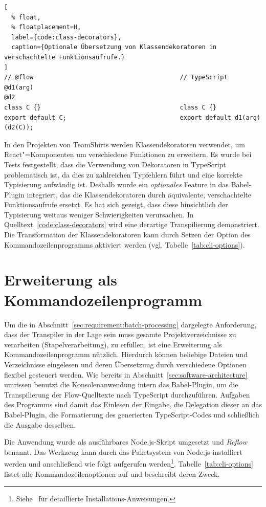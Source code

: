 {\begin{lstlisting}[
  % float,
  % floatplacement=H,
  label={code:class-decorators},
  caption={Optionale Übersetzung von Klassendekoratoren in verschachtelte Funktionsaufrufe.}
]
// @flow                                        // TypeScript
@d1(arg)
@d2
class C {}                                      class C {}
export default C;                               export default d1(arg)(d2(C));
\end{lstlisting}

In den Projekten von TeamShirts werden Klassendekoratoren verwendet, um React"=Komponenten um verschiedene Funktionen zu erweitern. Es wurde bei Tests festgestellt, dass die Verwendung von Dekoratoren in TypeScript problematisch ist, da dies zu zahlreichen Typfehlern führt und eine korrekte Typisierung aufwändig ist. Deshalb wurde ein \emph{optionales} Feature in das Babel-Plugin integriert, das die Klassendekoratoren durch äquivalente, verschachtelte Funktionsaufrufe ersetzt. Es hat sich gezeigt, dass diese hinsichtlich der Typisierung weitaus weniger Schwierigkeiten verursachen. In Quelltext~\ref{code:class-decorators} wird eine derartige Transpilierung demonstriert. Die Transformation der Klassendekoratoren kann durch Setzen der Option  des Kommandozeilenprogramms aktiviert werden (vgl. Tabelle~\ref{tab:cli-options}).

\section{Erweiterung als Kommandozeilenprogramm}
\label{sec:cli-program}

Um die in Abschnitt~\ref{sec:requirement:batch-processing} dargelegte Anforderung, dass der Transpiler in der Lage sein muss gesamte Projektverzeichnisse zu verarbeiten (Stapelverarbeitung), zu erfüllen, ist eine Erweiterung als Kommandozeilenprogramm nützlich. Hierdurch können beliebige Dateien und Verzeichnisse eingelesen und deren Übersetzung durch verschiedene Optionen flexibel gesteuert werden. Wie bereits in Abschnitt~\ref{sec:software-architecture} umrissen benutzt die Konsolenanwendung intern das Babel-Plugin, um die Transpilierung der Flow-Quelltexte nach TypeScript durchzuführen. Aufgaben des Programms sind damit das Einlesen der Eingabe, die Delegation dieser an das Babel-Plugin, die Formatierung des generierten TypeScript-Codes und schließlich die Ausgabe desselben.

Die Anwendung wurde als ausführbares Node.js-Skript umgesetzt und \textit{Reflow} benannt. Das Werkzeug kann durch das Paketsystem von Node.js installiert werden und anschließend wie folgt aufgerufen werden\footnote{Siehe~\autocite{REFLOW_GITHUB} für detaillierte Installations-Anweisungen.}. Tabelle~\ref{tab:cli-options} listet alle Kommandozeilenoptionen auf und beschreibt deren Zweck.

}
